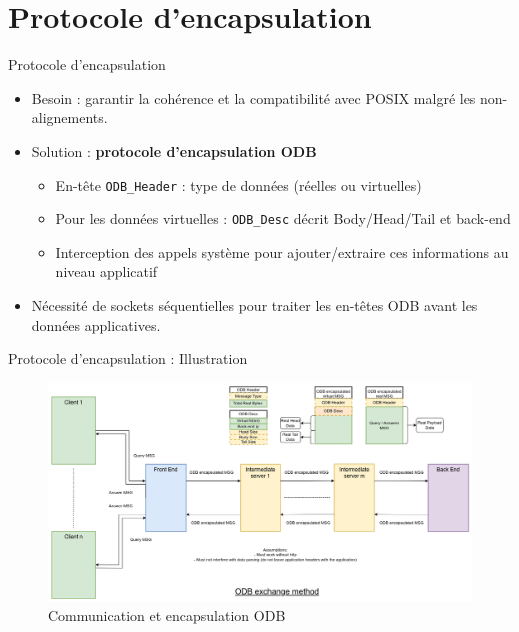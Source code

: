 \documentclass[aspectratio=43,8pt]{beamer}
\begin{document}
\section{Protocole d'encapsulation}
\begin{frame}{Protocole d'encapsulation}
\begin{card}
    \begin{itemize}
        \item Besoin : garantir la cohérence et la compatibilité avec POSIX malgré les non-alignements.
        \item Solution : \textbf{protocole d'encapsulation ODB} 
        \begin{itemize}
            \item En-tête \texttt{ODB\_Header} : type de données (réelles ou virtuelles)
            \item Pour les données virtuelles : \texttt{ODB\_Desc} décrit Body/Head/Tail et back-end
            \item Interception des appels système pour ajouter/extraire ces informations au niveau applicatif
        \end{itemize}
        \item Nécessité de sockets séquentielles pour traiter les en-têtes ODB avant les données applicatives.
    \end{itemize}
\end{card}

\end{frame}

\begin{frame}{Protocole d'encapsulation : Illustration}
\begin{figure}
    \centering
    \includegraphics[width=\textwidth]{img2/odb_communication.png}
    \caption{Communication et encapsulation ODB}
\end{figure}
\end{frame}
\end{document}
